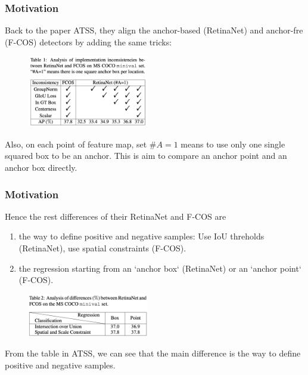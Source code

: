 \documentclass[slidetop, mathserif, dvipsnames]{beamer}
\begin{document}
\begin{frame}
    \frametitle{Motivation}

    Back to the paper ATSS, they align the anchor-based (RetinaNet)
    and anchor-fre (F-COS) detectors by adding the same tricks:

    \begin{figure}
    \includegraphics[width=150pt]{pics/atss_compare.png}
    \end{figure}

    Also, on each point of feature map, set $\#A=1$ means
    to use only one single squared box to be an anchor.
    This is aim to compare an anchor point and an anchor box directly.


\end{frame}

\begin{frame}
    \frametitle{Motivation}

    Hence the rest differences of their RetinaNet and F-COS are
    \begin{enumerate}
        \item the way to define positive and negative samples: Use IoU threholds (RetinaNet),
            use spatial constraints (F-COS).
        \item the regression starting from an `anchor box` (RetinaNet)
              or an `anchor point` (F-COS).
    \end{enumerate}

    \begin{figure}
    \includegraphics[width=150pt]{pics/atss_compare2.png}
    \end{figure}
    From the table in ATSS, we can see that the main difference
    is the way to define positive and negative samples.

\end{frame}
\end{document}
